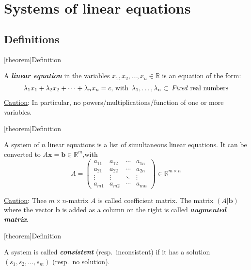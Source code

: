 \documentclass[12pt]{report}
\theoremstyle{definition}
\begin{document}
\section{Systems of linear equations}

\subsection{Definitions}

[theorem]{Definition}
\begin{linear equation}
    A \textbf{\emph{linear equation}} in the variables $x_1, x_2, \ldots, x_n \in \mathbb{R}$
    is an equation of the form:\[
        \lambda_1 x_1 + \lambda_2 x_2 + \cdots + \lambda_n x_n = c, 
        \,\textnormal{with }\, \lambda_1,\ldots,\lambda_n \subset \,\textnormal{\emph{Fixed} real numbers}
    \]
    \underline{Caution}: In particular, no powers/multiplications/function of one or more variables.
\end{linear equation}

[theorem]{Definition}
\begin{simultaneous list of linear equations}
    A system of $n$ linear equations is a list of simultaneous linear equations.
    It can be converted to $A\pmb{x} = \pmb{b} \in \mathbb{R}^{m}$,with\[
        A = \begin{pmatrix}
            a_{11} & a_{12} & \cdots & a_{1n} \\
            a_{21} & a_{22} & \cdots & a_{2n} \\
            \vdots & \vdots & \ddots & \vdots \\
            a_{m1} & a_{m2} & \cdots & a_{mn}
        \end{pmatrix} 
        \in \mathbb{R}^{m \times n}
    \]
\end{simultaneous list of linear equations}
\underline{Caution}: Thee $m \times n$-matrix $A$ is called coefficient matrix.
The matrix $(A|\pmb{b})$ where the vector $\pmb{b}$ is added as a column on the  right
is called \textbf{\emph{augmented matrix}}.

[theorem]{Definition}
\begin{consistent system}
    A system is called \textbf{\emph{consistent}} (resp.\ inconsistent)
    if it has a solution $(s_1, s_2, \ldots, s_m)$ (resp.\ no solution).
\end{consistent system}
\end{document}
